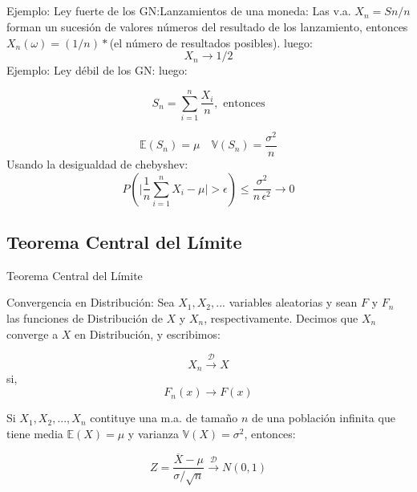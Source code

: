 \documentclass[
  ignorenonframetext,
]{beamer}
\begin{document}
\hypertarget{section-11}{%
\subsection{}\label{section-11}}

\begin{frame}{}

\justifying Ejemplo: Ley fuerte de los GN:Lanzamientos de una moneda:
Las v.a. \(X_n=Sn/n\) forman un sucesión de valores números del
resultado de los lanzamiento, entonces \(X_n(\omega)=(1/n)*\)(el número
de resultados posibles). luego: \[X_n \longrightarrow 1/2\]
\justifying Ejemplo: Ley débil de los GN: luego:

\[S_n=\sum_{i=1}^{n}\frac{X_i}{n}, \,\,\text{entonces} \]

\[\mathbb{E} (S_n)=\mu \quad\mathbb{V}  (S_n)=\frac{\sigma^2}{n} \]
Usando la desigualdad de chebyshev:
\[P(\bigg|\frac{1}{n}\sum_{i=1}^{n}X_i-\mu \bigg|>\epsilon)\leq \frac{\sigma^2}{n\,\epsilon^2}\longrightarrow 0 \]

\end{frame}

\hypertarget{teorema-central-del-luxedmite-1}{%
\subsection{Teorema Central del
Límite}\label{teorema-central-del-luxedmite-1}}

\begin{frame}{Teorema Central del Límite}

\justifying Convergencia en Distribución: Sea \(X_1,X_2,...\) variables
aleatorias y sean \(F\) y \(F_n\) las funciones de Distribución de \(X\)
y \(X_n\), respectivamente. Decimos que \(X_n\) converge a \(X\) en
Distribución, y escribimos:

\[\displaystyle X_n  \overset{\mathcal{D}}\longrightarrow X\] si,
\[\displaystyle F_n(x)  \longrightarrow F(x)\]

Si \(X_1,X_2,...,X_n\) contituye una m.a. de tamaño \(n\) de una
población infinita que tiene media \(\mathbb{E}(X)=\mu\) y varianza
\(\mathbb{V}(X)=\sigma^2\), entonces:

\[\displaystyle Z=\frac{\overline{X}-\mu }{\sigma/\sqrt{n} }  \overset{\mathcal{D}}\longrightarrow N(0,1)\]

\end{frame}
\end{document}
